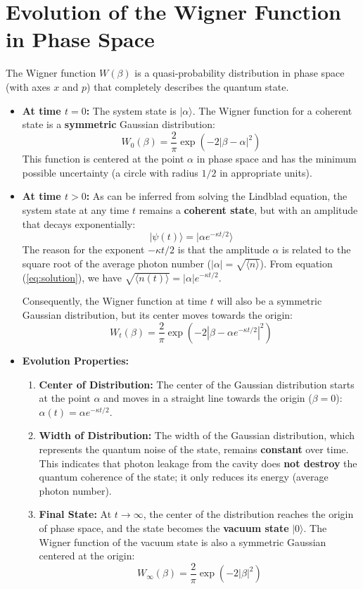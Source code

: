 \documentclass{article}
\begin{document}
\section{Evolution of the Wigner Function in Phase Space}
The Wigner function $W(\beta)$ is a quasi-probability distribution in phase space (with axes $x$ and $p$) that completely describes the quantum state.

\begin{itemize}
\item \textbf{At time $t=0$:} The system state is $\lvert \alpha \rangle$. The Wigner function for a coherent state is a \textbf{symmetric} Gaussian distribution:
\[
W_0(\beta) = \frac{2}{\pi} \exp\left( -2|\beta - \alpha|^2 \right)
\]
This function is centered at the point $\alpha$ in phase space and has the minimum possible uncertainty (a circle with radius $1/2$ in appropriate units).

\item \textbf{At time $t > 0$:} As can be inferred from solving the Lindblad equation, the system state at any time $t$ remains a \textbf{coherent state}, but with an amplitude that decays exponentially:
\[
\lvert \psi(t) \rangle = \lvert \alpha e^{-\kappa t / 2} \rangle
\]
The reason for the exponent $-\kappa t / 2$ is that the amplitude $\alpha$ is related to the square root of the average photon number ($|\alpha| = \sqrt{\langle n \rangle}$). From equation (\ref{eq:solution}), we have $\sqrt{\langle n(t) \rangle} = |\alpha| e^{-\kappa t / 2}$.

Consequently, the Wigner function at time $t$ will also be a symmetric Gaussian distribution, but its center moves towards the origin:
\[
W_t(\beta) = \frac{2}{\pi} \exp\left( -2|\beta - \alpha e^{-\kappa t / 2}|^2 \right)
\]

\item \textbf{Evolution Properties:}
\begin{enumerate}
    \item \textbf{Center of Distribution:} The center of the Gaussian distribution starts at the point $\alpha$ and moves in a straight line towards the origin ($\beta = 0$): $\alpha(t) = \alpha e^{-\kappa t / 2}$.
    \item \textbf{Width of Distribution:} The width of the Gaussian distribution, which represents the quantum noise of the state, remains \textbf{constant} over time. This indicates that photon leakage from the cavity does \textbf{not destroy} the quantum coherence of the state; it only reduces its energy (average photon number).
    \item \textbf{Final State:} At $t \to \infty$, the center of the distribution reaches the origin of phase space, and the state becomes the \textbf{vacuum state} $\lvert 0 \rangle$. The Wigner function of the vacuum state is also a symmetric Gaussian centered at the origin:
    \[
    W_{\infty}(\beta) = \frac{2}{\pi} \exp\left( -2|\beta|^2 \right)
    \]
\end{enumerate}
\end{itemize}
\end{document}
